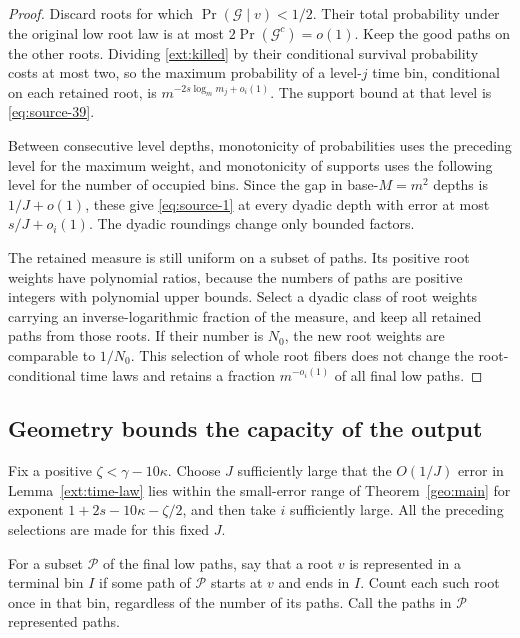 \begin{proof}
Discard roots for which
\(\Pr(\mathcal G\mid v)<1/2\). Their total probability under
the original low root law is at most
\(2\Pr(\mathcal G^c)=o(1)\). Keep the good paths on the other
roots. Dividing \eqref{ext:killed} by their conditional survival
probability costs at most two, so the maximum probability of a
level-\(j\) time bin, conditional on each retained root, is
\(m^{-2s\log_m m_j+o_i(1)}\). The support bound at that level
is \eqref{eq:source-39}.

Between consecutive level depths, monotonicity of probabilities
uses the preceding level for the maximum weight, and monotonicity
of supports uses the following level for the number of occupied
bins. Since the gap in base-\(M=m^2\) depths is
\(1/J+o(1)\), these give \eqref{eq:source-1} at every dyadic
depth with error at most \(s/J+o_i(1)\).
The dyadic roundings change only bounded factors.

The retained measure is still uniform on a subset of paths.
Its positive root weights have polynomial ratios, because the
numbers of paths are positive integers with polynomial upper
bounds. Select a dyadic class of root weights carrying an
inverse-logarithmic fraction of the measure, and keep all
retained paths from those roots. If their number is \(N_0\),
the new root weights are comparable to \(1/N_0\).
This selection of whole root fibers does not change the
root-conditional time laws and retains a fraction
\(m^{-o_i(1)}\) of all final low paths.
\end{proof}

\subsection{Geometry bounds the capacity of the output}

Fix a positive \(\zeta<\gamma-10\kappa\).
Choose \(J\) sufficiently large that the \(O(1/J)\) error in
Lemma~\ref{ext:time-law} lies within the small-error range of
Theorem~\ref{geo:main} for exponent
\(1+2s-10\kappa-\zeta/2\), and then take \(i\) sufficiently large.
All the preceding selections are made for this fixed \(J\).

For a subset \(\mathcal P\) of the final low paths, say that a root
\(v\) is represented in a terminal bin \(I\) if some path of
\(\mathcal P\) starts at \(v\) and ends in \(I\). Count each such
root once in that bin, regardless of the number of its paths.
Call the paths in \(\mathcal P\) represented paths.


